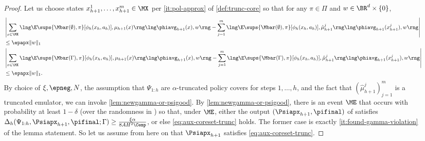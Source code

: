 \documentclass[11pt, oneside]{article}
\theoremstyle{plain}
\theoremstyle{definition}
\numberwithin{theorem}{section}
\newcommand{\trunccore}{truncated emulator\xspace}
\renewcommand{\^}[1]{^{(#1)}}
\begin{document}
\begin{proof}
Let us choose states $x_{h+1}^1, \ldots, x_{h+1}^m \in \MX$ per \cref{it:pol-approx} of \cref{def:trunc-core} so that for any $\pi \in \Pi$ and $w \in \BR^d \times \{ 0\}$,
  \begin{align}
   &  \left| \sum_{x \in \MX} \lng \E\sups{\Mbar(\emptyset), \pi}[\phi_h(x_h, a_h)], \mu_{h+1}(x) \rng  \lng \phiavg_{h+1}(x), w \rng -\sum_{j=1}^m \lng \E\sups{\Mbar(\emptyset), \pi}[\phi_h(x_h, a_h)], \hat \mu_{h+1}^j \rng  \lng  \phiavg_{h+1}(x_{h+1}^j), w \rng \right| \nonumber\\
    &\leq  \epapx \| w \|_1\label{eq:hatmu-approx-ep0-trunc0}\\
    &  \left| \sum_{x \in \MX} \lng \E\sups{\Mbar(\Gamma), \pi}[\phi_h(x_h, a_h)], \mu_{h+1}(x) \rng  \lng \phiavg_{h+1}(x), w \rng -\sum_{j=1}^m \lng \E\sups{\Mbar(\Gamma), \pi}[\phi_h(x_h, a_h)], \hat \mu_{h+1}^j \rng  \lng  \phiavg_{h+1}(x_{h+1}^j), w \rng \right|\nonumber\\
    &\leq \epapx \| w \|_1\label{eq:hatmu-approx-ep0-truncg}.
  \end{align}
  By choice of $\xi,\epneg, N$, the assumption that $\Psi_{1:h}$ are $\alpha$-truncated policy covers for steps $1,\dots,h$, and the fact that $(\hat\mu_{h+1}^j)_{j=1}^m$ is a \trunccore, we can invoke \cref{lem:newgamma-or-psigood}. By \cref{lem:newgamma-or-psigood}, there is an event $\ME$ that occurs with probability at least $1-\delta$ (over the randomness in \PC) so that, under $\ME$, either the output $(\Psiapx_{h+1}, \pifinal)$ of \PC satisfies $\Delta_h(\Psi_{1:h}, \Psiapx_{h+1}, \pifinal;\Gamma) \geq \frac{\xi\alpha}{8AH^2 \Cemp}$, or else \cref{eq:aux-coreset-trunc} holds. The former case is exactly \cref{it:found-gamma-violation} of the lemma statement.
  So let us assume from here on that $\Psiapx_{h+1}$ satisfies \cref{eq:aux-coreset-trunc}.


\end{proof}
\end{document}
